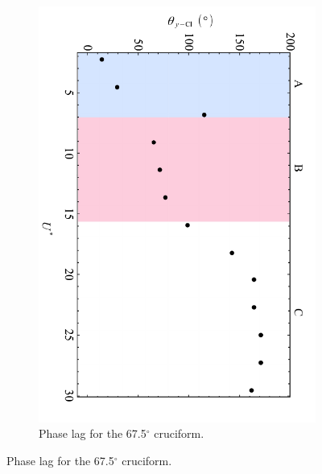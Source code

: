\documentclass[oneside]{utmthesis}
\begin{document}
\begin{figure}[H]
  \centering
  \begin{subfigure}[h]{0.9\textwidth}
    \includegraphics[angle=90,width=\textwidth]{figs/phaseLag4}
    \caption{Phase lag for the 67.5$^{\circ}$ cruciform.}
    \label{fig:phaseLag675deg}
  \end{subfigure}


\end{figure}
\end{document}
